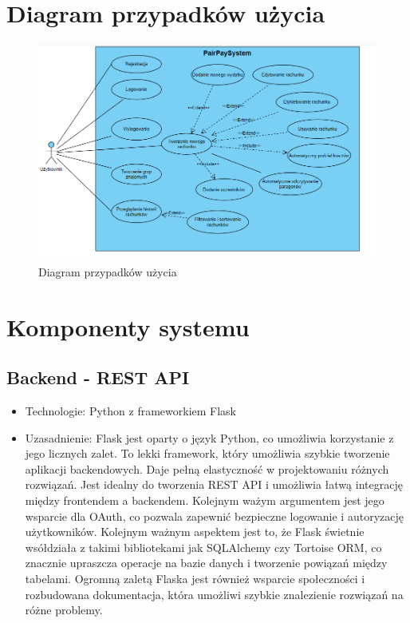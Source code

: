 \documentclass[12pt,titlepage]{article}
\begin{document}
\newpage

\section{Diagram przypadków użycia}
\begin{figure}[h]
    \centering
    \includegraphics[width=1\textwidth]{img/UserDiagram.png}
    \caption{Diagram przypadków użycia}
    \label{fig:mesh1}
\end{figure}


\newpage
\section{Komponenty systemu}
\subsection{Backend - REST API}
\begin{itemize}
    \item Technologie: Python z frameworkiem Flask
    \item Uzasadnienie: Flask jest oparty o język Python, co umożliwia korzystanie z jego licznych zalet. To lekki framework, który umożliwia szybkie tworzenie aplikacji backendowych. Daje pełną elastyczność w projektowaniu różnych rozwiązań. Jest idealny do tworzenia REST API i umożliwia łatwą integrację między frontendem a backendem. Kolejnym ważym argumentem jest jego wsparcie dla OAuth, co pozwala zapewnić bezpieczne logowanie i autoryzację użytkowników. Kolejnym ważnym aspektem jest to, że Flask świetnie wsółdziała z takimi bibliotekami jak SQLAlchemy czy Tortoise ORM, co znacznie upraszcza operacje na bazie danych i tworzenie powiązań między tabelami. Ogromną zaletą Flaska jest również wsparcie społeczności i rozbudowana dokumentacja, która umożliwi szybkie znalezienie rozwiązań na różne problemy.
\end{itemize}
\end{document}
